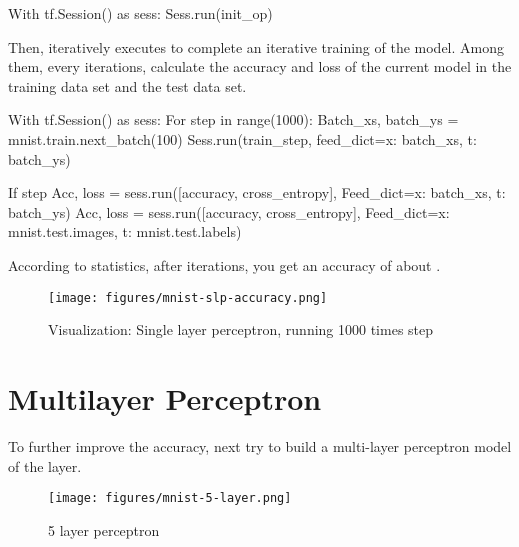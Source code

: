 \begin{content}
\begin{content}
\begin{leftbar}
\begin{python}
With tf.Session() as sess:
  Sess.run(init_op)
\end{python}
\end{leftbar}

Then, iteratively executes  to complete an iterative training of the model. Among them, every  iterations, calculate the accuracy and loss of the current model in the training data set and the test data set.

\begin{leftbar}
\begin{python}
With tf.Session() as sess:
  For step in range(1000):
    Batch_xs, batch_ys = mnist.train.next_batch(100)        
    Sess.run(train_step, feed_dict={x: batch_xs, t: batch_ys})
    
    If step %
      Acc, loss = sess.run([accuracy, cross_entropy], 
        Feed_dict={x: batch_xs, t: batch_ys})
      Acc, loss = sess.run([accuracy, cross_entropy], 
        Feed_dict={x: mnist.test.images, t: mnist.test.labels}) 
\end{python}
\end{leftbar}

According to statistics, after  iterations, you get an accuracy of about .

\begin{figure}[H]
\centering
\texttt{[image: figures/mnist-slp-accuracy.png]}
\caption{Visualization: Single layer perceptron, running 1000 times step}
 \label{fig:mnist-slp-accuracy}
\end{figure}

\end{content}

\section{Multilayer Perceptron}

\begin{content}

To further improve the accuracy, next try to build a multi-layer perceptron model of the  layer.

\begin{figure}[H]
\centering
\texttt{[image: figures/mnist-5-layer.png]}
\caption{5 layer perceptron}
 \label{fig:mnist-5-layer}
\end{figure}


\end{content}
\end{content}
